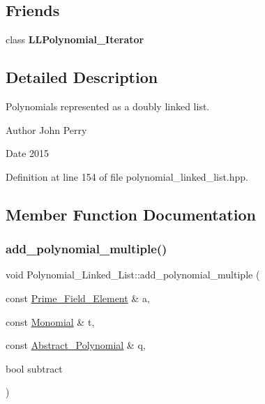 \subsection*{Friends}
\begin{DoxyCompactItemize}
\item 
\mbox{\label{class_polynomial___linked___list_adc04ceaa684cbc36bd6800c57364bd2e}} 
class {\bfseries L\+L\+Polynomial\+\_\+\+Iterator}
\end{DoxyCompactItemize}


\subsection{Detailed Description}
Polynomials represented as a doubly linked list. 

\begin{DoxyAuthor}{Author}
John Perry 
\end{DoxyAuthor}
\begin{DoxyDate}{Date}
2015 
\end{DoxyDate}


Definition at line 154 of file polynomial\+\_\+linked\+\_\+list.\+hpp.



\subsection{Member Function Documentation}
\mbox{\label{class_polynomial___linked___list_a5f2b566107fb8894172f4e309320ee07}} 
\subsubsection{\texorpdfstring{add\+\_\+polynomial\+\_\+multiple()}{add\_polynomial\_multiple()}}
{\footnotesize\ttfamily void Polynomial\+\_\+\+Linked\+\_\+\+List\+::add\+\_\+polynomial\+\_\+multiple (\begin{DoxyParamCaption}\item[{const \hyperlink{class_prime___field___element}{Prime\+\_\+\+Field\+\_\+\+Element} \&}]{a,  }\item[{const \hyperlink{class_monomial}{Monomial} \&}]{t,  }\item[{const \hyperlink{class_abstract___polynomial}{Abstract\+\_\+\+Polynomial} \&}]{q,  }\item[{bool}]{subtract }\end{DoxyParamCaption})\hspace{0.3cm}{\ttfamily [virtual]}}



